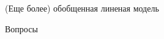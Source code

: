 \documentclass[10pt]{beamer}
\begin{document}
\begin{frame}{(Еще более) обобщенная линеная модель}
\end{frame}

\begin{frame}

\begin{center}
\Large Вопросы
\end{center}

\end{frame}
\end{document}
